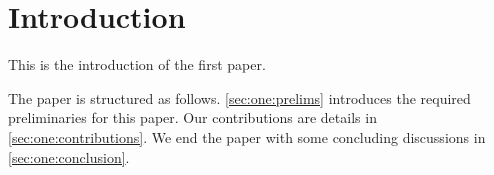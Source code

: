 \section{Introduction}
\label{sec:one:intro}

This is the introduction of the first paper. \macrosforpaper

The paper is structured as follows. \cref{sec:one:prelims} introduces the required preliminaries for this paper. Our contributions are details in \cref{sec:one:contributions}. We end the paper with some concluding discussions in \cref{sec:one:conclusion}. 